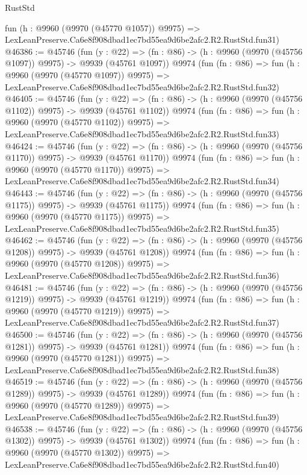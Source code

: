 \begin{lexlean}{RustStd}
\begin{coremodule}
    fun (h : @9960 (@9970 (@45770 @1057)) @9975) =>
    LexLeanPreserve.Ca6e8f908dbad1ec7bd55ea9d6be2afc2.R2.RustStd.fun31)
@46386 := @45746
    (fun (y : @22) =>
    (fn : @86) -> (h : @9960 (@9970 (@45756 @1097)) @9975) -> @9939 (@45761 @1097))
    @9974
    (fun (fn : @86) =>
    fun (h : @9960 (@9970 (@45770 @1097)) @9975) =>
    LexLeanPreserve.Ca6e8f908dbad1ec7bd55ea9d6be2afc2.R2.RustStd.fun32)
@46405 := @45746
    (fun (y : @22) =>
    (fn : @86) -> (h : @9960 (@9970 (@45756 @1102)) @9975) -> @9939 (@45761 @1102))
    @9974
    (fun (fn : @86) =>
    fun (h : @9960 (@9970 (@45770 @1102)) @9975) =>
    LexLeanPreserve.Ca6e8f908dbad1ec7bd55ea9d6be2afc2.R2.RustStd.fun33)
@46424 := @45746
    (fun (y : @22) =>
    (fn : @86) -> (h : @9960 (@9970 (@45756 @1170)) @9975) -> @9939 (@45761 @1170))
    @9974
    (fun (fn : @86) =>
    fun (h : @9960 (@9970 (@45770 @1170)) @9975) =>
    LexLeanPreserve.Ca6e8f908dbad1ec7bd55ea9d6be2afc2.R2.RustStd.fun34)
@46443 := @45746
    (fun (y : @22) =>
    (fn : @86) -> (h : @9960 (@9970 (@45756 @1175)) @9975) -> @9939 (@45761 @1175))
    @9974
    (fun (fn : @86) =>
    fun (h : @9960 (@9970 (@45770 @1175)) @9975) =>
    LexLeanPreserve.Ca6e8f908dbad1ec7bd55ea9d6be2afc2.R2.RustStd.fun35)
@46462 := @45746
    (fun (y : @22) =>
    (fn : @86) -> (h : @9960 (@9970 (@45756 @1208)) @9975) -> @9939 (@45761 @1208))
    @9974
    (fun (fn : @86) =>
    fun (h : @9960 (@9970 (@45770 @1208)) @9975) =>
    LexLeanPreserve.Ca6e8f908dbad1ec7bd55ea9d6be2afc2.R2.RustStd.fun36)
@46481 := @45746
    (fun (y : @22) =>
    (fn : @86) -> (h : @9960 (@9970 (@45756 @1219)) @9975) -> @9939 (@45761 @1219))
    @9974
    (fun (fn : @86) =>
    fun (h : @9960 (@9970 (@45770 @1219)) @9975) =>
    LexLeanPreserve.Ca6e8f908dbad1ec7bd55ea9d6be2afc2.R2.RustStd.fun37)
@46500 := @45746
    (fun (y : @22) =>
    (fn : @86) -> (h : @9960 (@9970 (@45756 @1281)) @9975) -> @9939 (@45761 @1281))
    @9974
    (fun (fn : @86) =>
    fun (h : @9960 (@9970 (@45770 @1281)) @9975) =>
    LexLeanPreserve.Ca6e8f908dbad1ec7bd55ea9d6be2afc2.R2.RustStd.fun38)
@46519 := @45746
    (fun (y : @22) =>
    (fn : @86) -> (h : @9960 (@9970 (@45756 @1289)) @9975) -> @9939 (@45761 @1289))
    @9974
    (fun (fn : @86) =>
    fun (h : @9960 (@9970 (@45770 @1289)) @9975) =>
    LexLeanPreserve.Ca6e8f908dbad1ec7bd55ea9d6be2afc2.R2.RustStd.fun39)
@46538 := @45746
    (fun (y : @22) =>
    (fn : @86) -> (h : @9960 (@9970 (@45756 @1302)) @9975) -> @9939 (@45761 @1302))
    @9974
    (fun (fn : @86) =>
    fun (h : @9960 (@9970 (@45770 @1302)) @9975) =>
    LexLeanPreserve.Ca6e8f908dbad1ec7bd55ea9d6be2afc2.R2.RustStd.fun40)

\end{coremodule}
\end{lexlean}
